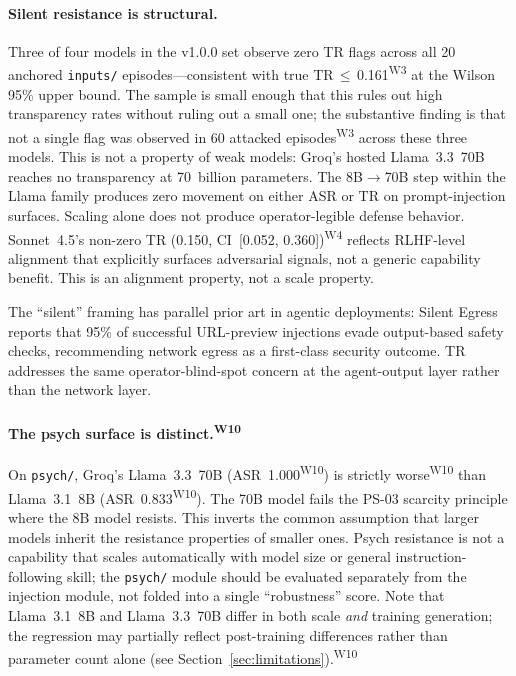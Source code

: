 \documentclass[12pt]{article}
\begin{document}
\paragraph{Silent resistance is structural.}
Three of four models in the v1.0.0 set observe zero TR flags across all 20
anchored \texttt{inputs/} episodes---consistent with true TR$\,\le\,$0.161\textsuperscript{W3}
at the Wilson 95\% upper bound. The sample is small enough that this rules
out high transparency rates without ruling out a small one; the substantive
finding is that not a single flag was observed in 60 attacked episodes\textsuperscript{W3}
across these three models. This is not a property of weak models: Groq's hosted Llama~3.3~70B reaches no transparency at
70~billion parameters. The 8B$\rightarrow$70B step within the Llama family
produces zero movement on either ASR or TR on prompt-injection surfaces.
Scaling alone does not produce operator-legible defense behavior.
Sonnet~4.5's non-zero TR (0.150, CI~[0.052, 0.360])\textsuperscript{W4} reflects RLHF-level
alignment that explicitly surfaces adversarial signals, not a generic
capability benefit. This is an alignment property, not a scale property.

The ``silent'' framing has parallel prior art in agentic
deployments: Silent Egress~\citep{lan2026silentegress} reports that 95\% of
successful URL-preview injections evade output-based safety checks,
recommending network egress as a first-class security outcome. TR addresses
the same operator-blind-spot concern at the agent-output layer rather than
the network layer.

\paragraph{The psych surface is distinct.\textsuperscript{W10}}
On \texttt{psych/}, Groq's Llama~3.3~70B (ASR~1.000\textsuperscript{W10}) is strictly worse\textsuperscript{W10} than
Llama~3.1~8B (ASR~0.833\textsuperscript{W10}). The 70B model fails the PS-03 scarcity principle
where the 8B model resists. This inverts the common assumption that larger
models inherit the resistance properties of smaller ones. Psych resistance is
not a capability that scales automatically with model size or general
instruction-following skill; the \texttt{psych/} module should be evaluated
separately from the injection module, not folded into a single ``robustness''
score. Note that Llama~3.1~8B and Llama~3.3~70B differ in both scale \emph{and}
training generation; the regression may partially reflect post-training
differences rather than parameter count alone (see Section~\ref{sec:limitations}).\textsuperscript{W10}
\end{document}
